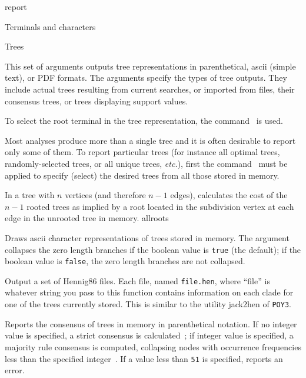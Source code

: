 \begin{command}{report}{}
\begin{arguments}
\begin{argumentgroup}{Terminals and characters}
		\end{argumentgroup}

		\begin{argumentgroup}{Trees}
            {This set of arguments outputs tree representations
            in parenthetical, ascii (simple text), or PDF formats.
            The arguments specify the types of tree outputs. They include
            actual trees resulting from current searches, or imported from
            files, their consensus trees, or trees displaying support values.
            
            To select the root terminal in the tree representation, the command~ is used.
            
            Most analyses produce more than a single tree and it is
            often desirable to report only some of them. To
            report particular trees (for instance all optimal trees,
            randomly-selected trees, or all unique trees, \emph{etc.}), first the
            command~ must be applied to specify (select)
             the desired trees from all those stored in memory.} 

                {In a tree with $n$ vertices (and therefore $n - 1$ edges),
                calculates the cost of the $n - 1$ rooted trees as implied by a
                root located in the subdivision vertex at each edge in the unrooted
                tree in memory.}
                {allroots}

                {Draws ascii character representations of trees stored in memory. The
                argument  collapses the zero length branches if
                the boolean value is \texttt{true} (the default); if the boolean value is
                \texttt{false}, the zero length branches are not collapsed.}
				{}

	     {Output a set of Hennig86 files. Each file, named \texttt{file.hen},
                where ``file'' is whatever string you pass to this function
                contains information on each clade for one of the trees
                currently stored. This is similar to the utility jack2hen 
                of \texttt{POY3}.}
				{}

                {Reports the consensus of trees in memory in parenthetical notation.
                If no integer value is
                specified, a strict consensus is calculated~\cite{rohlf1982};
                if integer value is specified,
                a majority rule consensus is computed, collapsing nodes with
                occurrence frequencies less than the specified integer~\cite{margush1981}.
                If a value less
                than \texttt{51} is specified, \poy reports an error.} 
                {}


\end{argumentgroup}
\end{arguments}
\end{command}

